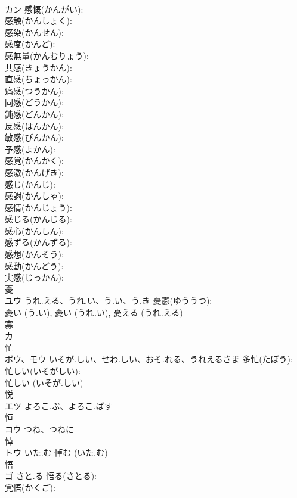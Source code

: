 \documentclass[8pt]{extreport}
\begin{document}
\begin{CJK}{UTF8}{min}
\\	カン		感慨(かんがい): 
\\	感触(かんしょく): 
\\	感染(かんせん): 
\\	感度(かんど): 
\\	感無量(かんむりょう): 
\\	共感(きょうかん): 
\\	直感(ちょっかん): 
\\	痛感(つうかん): 
\\	同感(どうかん): 
\\	鈍感(どんかん): 
\\	反感(はんかん): 
\\	敏感(びんかん): 
\\	予感(よかん): 
\\	感覚(かんかく): 
\\	感激(かんげき): 
\\	感じ(かんじ): 
\\	感謝(かんしゃ): 
\\	感情(かんじょう): 
\\	感じる(かんじる): 
\\	感心(かんしん): 
\\	感ずる(かんずる): 
\\	感想(かんそう): 
\\	感動(かんどう): 
\\	実感(じっかん): 
\\	憂			
\\	ユウ	うれ.える、うれ.い、う.い、う.き	憂鬱(ゆううつ): 
\\	憂い (う.い), 憂い (うれ.い), 憂える (うれ.える)
\\	寡			
\\	カ			
\\	忙			
\\	ボウ、モウ	いそが.しい、せわ.しい、おそ.れる、うれえるさま	多忙(たぼう): 
\\	忙しい(いそがしい): 
\\	忙しい (いそが.しい)
\\	悦			
\\	エツ	よろこ.ぶ、よろこ.ばす		
\\	恒			
\\	コウ	つね、つねに		
\\	悼			
\\	トウ	いた.む		悼む (いた.む)
\\	悟			
\\	ゴ	さと.る	悟る(さとる): 
\\	覚悟(かくご): 

\end{CJK}
\end{document}
